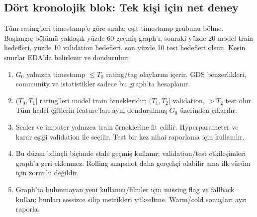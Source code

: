 \documentclass[11pt,a4paper]{article}
\begin{document}
\subsection{Dört kronolojik blok: Tek kişi için net deney}
Tüm rating'leri timestamp'e göre sırala; eşit timestamp grubunu bölme. Başlangıç bölümü yaklaşık yüzde 60 geçmiş graph'ı, sonraki yüzde 20 model train hedefleri, yüzde 10 validation hedefleri, son yüzde 10 test hedefleri olsun. Kesin sınırlar EDA'da belirlenir ve dondurulur:
\begin{center}
\end{center}

\begin{enumerate}
\item $G_0$ yalnızca timestamp $\leq T_0$ rating/tag olaylarını içerir. GDS benzerlikleri, community ve istatistikler sadece bu graph'ta hesaplanır.
\item $(T_0,T_1]$ rating'leri model train örnekleridir; $(T_1,T_2]$ validation, $>T_2$ test olur. Tüm hedef çiftlerin feature'ları aynı dondurulmuş $G_0$ üzerinden çıkarılır.
\item Scaler ve imputer yalnızca train örneklerine fit edilir. Hyperparameter ve karar eşiği validation ile seçilir. Test bir kez nihai raporlama için kullanılır.
\item Bu düzen bilinçli biçimde stale geçmiş kullanır; validation/test etkileşimleri graph'a geri eklenmez. Rolling snapshot daha gerçekçi olabilir ama ilk sürüm için zorunlu değildir.
\item Graph'ta bulunmayan yeni kullanıcı/filmler için missing flag ve fallback kullan; bunları sessizce silip metrikleri yükseltme. Warm/cold sonuçları ayrı raporla.
\end{enumerate}
\end{document}
